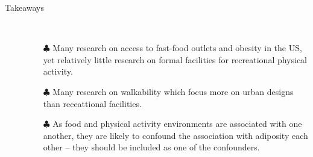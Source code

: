 \documentclass{article}
\begin{document}
\begin{itemize}
\begin{description}
			\item[Takeaways] \mbox{}\\ 
    				\begin{itemize}
    					\item[$\clubsuit$] Many research on access to fast-food outlets and obesity in the US, yet relatively little research on formal facilities for recreational physical activity.
    					\item[$\clubsuit$] Many research on walkability which focus more on urban designs than receattional facilities.
    					\item[$\clubsuit$] As food and physical activity environments are associated with one another, they are likely to confound the association with adiposity each other -- they should be included as one of the confounders. 
    					
    				\end{itemize}	
		\end{description}


\end{itemize}
\end{document}
